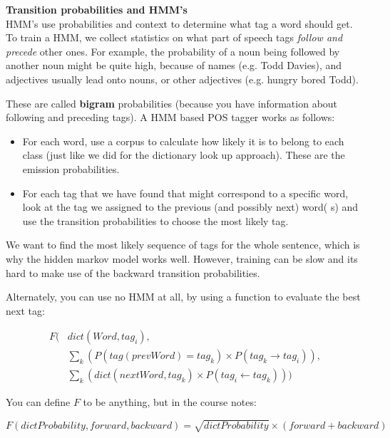 \begin{description}
  \item \textbf{Transition probabilities and HMM's}\\

  HMM's use probabilities and context to determine what tag a word should get.
  To train a HMM, we collect statistics on what part of speech tags
  \textit{follow and precede} other ones. For example, the probability of a noun
  being followed by another noun might be quite high, because of names (e.g.
  Todd Davies), and adjectives usually lead onto nouns, or other adjectives
  (e.g. hungry bored Todd).

  These are called \textbf{bigram} probabilities (because you have information
  about following and preceding tags). A HMM based POS tagger works as follows:

  \begin{itemize}
    \item For each word, use a corpus to calculate how likely it is to belong 
    to each class (just like we did for the dictionary look up approach). These 
    are the emission probabilities.
    \item For each tag that we have found that might correspond to a specific 
    word, look at the tag we assigned to the previous (and possibly next) word(
    s) and use the transition probabilities to choose the most likely tag.
  \end{itemize}

  We want to find the most likely sequence of tags for the whole sentence, which
  is why the hidden markov model works well. However, training can be slow and
  its hard to make use of the backward transition probabilities.


  Alternately, you can use no HMM at all, by using a function to evaluate the
  best next tag:

  \[
    \begin{split}
    F(&dict(Word, tag_i),\\
      &\sum_k(P(tag(prevWord) = tag_k) \times P(tag_k \rightarrow tag_i)),\\
      &\sum_k(dict(nextWord, tag_k) \times P(tag_i \leftarrow tag_k)))
    \end{split}
  \]

  You can define $F$ to be anything, but in the course notes:

  \[
    F(dictProbability, forward, backward) = \sqrt{dictProbability} \times 
      (forward + backward)
  \]


\end{description}
